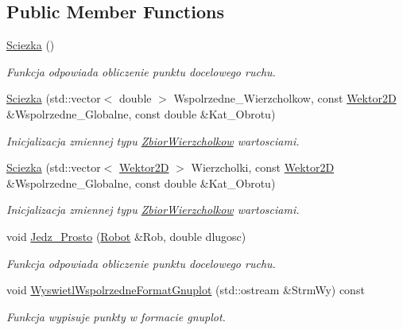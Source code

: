 \subsection*{Public Member Functions}
\begin{DoxyCompactItemize}
\item 
\hypertarget{class_sciezka_a95e9a0c51da72e4bd4edcca9f9ea7de4}{\hyperlink{class_sciezka_a95e9a0c51da72e4bd4edcca9f9ea7de4}{Sciezka} ()}\label{class_sciezka_a95e9a0c51da72e4bd4edcca9f9ea7de4}

\begin{DoxyCompactList}\small\item\em Funkcja odpowiada obliczenie punktu docelowego ruchu. \end{DoxyCompactList}\item 
\hyperlink{class_sciezka_a61da1d068b1b4cf437959dd4ec4f31b2}{Sciezka} (std\+::vector$<$ double $>$ Wspolrzedne\+\_\+\+Wierzcholkow, const \hyperlink{class_wektor2_d}{Wektor2\+D} \&Wspolrzedne\+\_\+\+Globalne, const double \&Kat\+\_\+\+Obrotu)
\begin{DoxyCompactList}\small\item\em Inicjalizacja zmiennej typu \hyperlink{class_zbior_wierzcholkow}{Zbior\+Wierzcholkow} wartosciami. \end{DoxyCompactList}\item 
\hyperlink{class_sciezka_ad33404b8f457cbd792fe746e639a0401}{Sciezka} (std\+::vector$<$ \hyperlink{class_wektor2_d}{Wektor2\+D} $>$ Wierzcholki, const \hyperlink{class_wektor2_d}{Wektor2\+D} \&Wspolrzedne\+\_\+\+Globalne, const double \&Kat\+\_\+\+Obrotu)
\begin{DoxyCompactList}\small\item\em Inicjalizacja zmiennej typu \hyperlink{class_zbior_wierzcholkow}{Zbior\+Wierzcholkow} wartosciami. \end{DoxyCompactList}\item 
void \hyperlink{class_sciezka_a37541491882dcd2e327f58207f376bd2}{Jedz\+\_\+\+Prosto} (\hyperlink{class_robot}{Robot} \&Rob, double dlugosc)
\begin{DoxyCompactList}\small\item\em Funkcja odpowiada obliczenie punktu docelowego ruchu. \end{DoxyCompactList}\item 
void \hyperlink{class_sciezka_a9fc6b8104ec42ffd5146fe4ca8ddd1ac}{Wyswietl\+Wspolrzedne\+Format\+Gnuplot} (std\+::ostream \&Strm\+Wy) const 
\begin{DoxyCompactList}\small\item\em Funkcja wypisuje punkty w formacie gnuplot. \end{DoxyCompactList}\item 

\end{DoxyCompactItemize}
